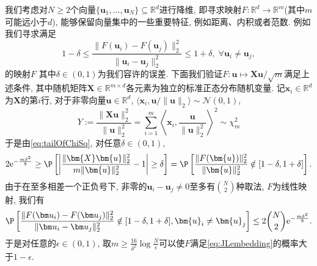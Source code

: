 \begin{example}
	我们考虑对$N \geq 2$个向量$\{\bm u_1, \dots, \bm u_N\} \subseteq \mathbb{R}^d$进行降维, 即寻求映射$F \colon \mathbb{R}^d \to \mathbb{R}^m$(其中$m$可能远小于$d$), 能够保留向量集中的一些重要特征, 例如距离、内积或者范数. 
	例如我们寻求满足
	\begin{equation}\label{eq:JLembedding}
		1 - \delta \leq \frac{\|F(\bm u_i) - F(\bm u_j)\|_2^2}{\|\bm u_i - \bm u_j\|_2^2} \leq 1 + \delta,\; \forall \bm u_i \neq \bm u_j, 
	\end{equation}的映射$F$
	其中$\delta \in (0,1)$为我们容许的误差. 
	下面我们验证$F \colon \bm{u} \mapsto \bm{X}\bm{u} / \sqrt{m}$满足上述条件, 其中随机矩阵$\bm X \in \mathbb{R}^{m \times d}$各元素为独立的标准正态分布随机变量. 
	记$\bm{x}_i \in \mathbb{R}^d$为$\bm{X}$的第$i$行, 对于非零向量$\bm{u} \in \mathbb{R}^d$, $\langle \bm{x}_i, \bm{u} / \|\bm{u}\|_2 \rangle \sim \mathcal{N}(0,1)$, 
	\begin{equation*}
		Y 
		:= \frac{\|\bm{X} \bm{u}\|_2^2}{\|\bm{u}\|_2^2}
		= \sum_{i=1}^m \left\langle \bm{x}_i, \frac{\bm{u}}{\|\bm{u}\|_2^2} \right\rangle^2
		\sim \chi^2_m
	\end{equation*}
	于是由\eqref{eq:tailOfChiSq}, 对任意$\delta \in (0,1)$, 
	\begin{align*}
		2 \mathrm{e}^{- \frac{m \delta^2}{8}}
		\geq \P \left[ \left| \frac{\|\bm{X} \bm{u}\|_2^2}{m \|\bm{u}\|_2^2} - 1 \right| \geq \delta \right]
		=  \P \left[ \frac{\|F(\bm{u})\|_2^2}{\|\bm{u}\|_2^2} \notin [1-\delta,1+\delta] \right]. 
	\end{align*}
	由于在至多相差一个正负号下, 非零的$\bm{u}_i - \bm{u}_j \neq 0$至多有$\binom{N}{2}$种取法, $F$为线性映射, 我们有
	\begin{equation*}
		\P \left[ \frac{\|F(\bm u_i) - F(\bm u_j)\|_2^2}{\|\bm u_i - \bm u_j\|_2^2} \notin [1-\delta,1+\delta], \bm{u}_i \neq \bm{u}_j \right]
		\leq 2 \binom{N}{2} \mathrm{e}^{- \frac{m \delta^2}{8}}. 
	\end{equation*}
	于是对任意的$\epsilon \in (0,1)$, 取$m \geq \frac{16}{\delta^2} \log \frac{N}{\epsilon}$可以使$F$满足\eqref{eq:JLembedding}的概率大于$1 - \epsilon$. 
\end{example}

